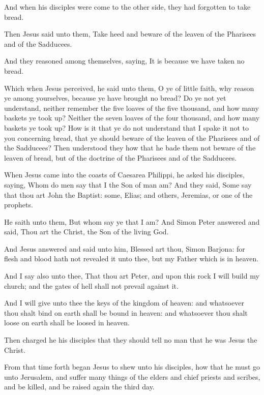 \Verse And when his disciples were come to the other side, they had forgotten to take bread.

\Verse Then Jesus said unto them, Take heed and beware of the leaven of the Pharisees and of the Sadducees.

\Verse And they reasoned among themselves, saying, It is because we have taken no bread.

\Verse Which when Jesus perceived, he said unto them, O ye of little faith, why reason ye among yourselves, because ye have brought no bread?  \Verse Do ye not yet understand, neither remember the five loaves of the five thousand, and how many baskets ye took up?  \Verse Neither the seven loaves of the four thousand, and how many baskets ye took up?  \Verse How is it that ye do not understand that I spake it not to you concerning bread, that ye should beware of the leaven of the Pharisees and of the Sadducees?  \Verse Then understood they how that he bade them not beware of the leaven of bread, but of the doctrine of the Pharisees and of the Sadducees.

\Verse When Jesus came into the coasts of Caesarea Philippi, he asked his disciples, saying, Whom do men say that I the Son of man am?  \Verse And they said, Some say that thou art John the Baptist: some, Elias; and others, Jeremias, or one of the prophets.

\Verse He saith unto them, But whom say ye that I am?  \Verse And Simon Peter answered and said, Thou art the Christ, the Son of the living God.

\Verse And Jesus answered and said unto him, Blessed art thou, Simon Barjona: for flesh and blood hath not revealed it unto thee, but my Father which is in heaven.

\Verse And I say also unto thee, That thou art Peter, and upon this rock I will build my church; and the gates of hell shall not prevail against it.

\Verse And I will give unto thee the keys of the kingdom of heaven: and whatsoever thou shalt bind on earth shall be bound in heaven: and whatsoever thou shalt loose on earth shall be loosed in heaven.

\Verse Then charged he his disciples that they should tell no man that he was Jesus the Christ.

\Verse From that time forth began Jesus to shew unto his disciples, how that he must go unto Jerusalem, and suffer many things of the elders and chief priests and scribes, and be killed, and be raised again the third day.

